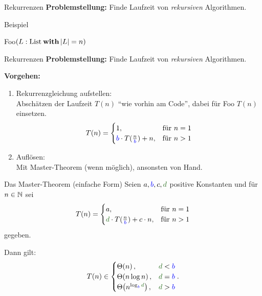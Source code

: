 
\begin{frame}{Rekurrenzen}
	\textbf{Problemstellung:} Finde Laufzeit von \emph{rekursiven} Algorithmen.
	
	\begin{exampleblock}{Beispiel}
		\begin{algorithm}[H]
			\KwMethod Foo$(L: \|List| \: \KwSty{with} \size{L} = n)$
		\end{algorithm}
	\end{exampleblock}
\end{frame}

\begin{frame}{Rekurrenzen}
	\textbf{Problemstellung:} Finde Laufzeit von \emph{rekursiven} Algorithmen.
	
	\textbf{Vorgehen:}
	\begin{enumerate}
		\item Rekurrenzgleichung aufstellen:\\
		Abschätzen der Laufzeit $T(n)$ \enquote{wie vorhin am Code}, dabei für Foo $T(n)$ einsetzen.
		\[
		T(n) = 
		\begin{cases}
		1,  & \text{für } n = 1 \\
		\textcolor{blue}{b} \cdot T\large(\frac{n}{\textcolor{blue}{b}}\large) + n, & \text{für } n > 1
		\end{cases}
		\]
		
		\item Auflösen:\\ 
		Mit Master-Theorem (wenn möglich), ansonsten von Hand.
	\end{enumerate}

\end{frame}

\begin{frame}{Das Master-Theorem (einfache Form)} %
	Seien $a, \textcolor{blue}{b}, c, \textcolor{darkgreen}{d}$ positive Konstanten und für $n \in \mathbb{N}$ sei 
	\[
	T(n) = 
	\begin{cases}
	a,  & \text{für } n = 1 \\
	\textcolor{darkgreen}{d} \cdot T\large(\frac{n}{\textcolor{blue}{b}}\large) + c\·n, & \text{für } n > 1
	\end{cases}
	\]
	gegeben. \\ \smallskip
	
	Dann gilt:
	\[
	T(n) \in 
	\begin{cases}
	\Th{n},                                                        & \textcolor{darkgreen}{d} < \textcolor{blue}{b} \\
	\Th{n \log n},                                                 & \textcolor{darkgreen}{d} = \textcolor{blue}{b} \\
	\Th{n^{\log _{\textcolor{blue}{b}} \textcolor{darkgreen}{d}}}, & \textcolor{darkgreen}{d} > \textcolor{blue}{b}
	\end{cases}.
	\]
\end{frame}


